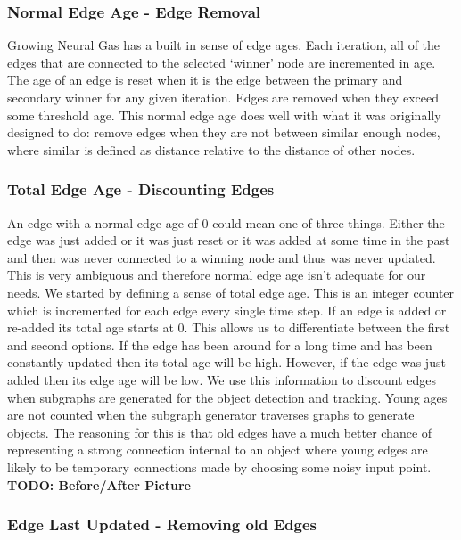 \documentclass{article}
\renewcommand{\|}{\origbar} %
\begin{document}
\subsubsection{Normal Edge Age - Edge Removal}

Growing Neural Gas has a built in sense of edge ages. Each iteration, all of the edges that are connected to the selected `winner' node are incremented in age. The age of an edge is reset when it is the edge between the primary and secondary winner for any given iteration. Edges are removed when they exceed some threshold age. This normal edge age does well with what it was originally designed to do: remove edges when they are not between similar enough nodes, where similar is defined as distance relative to the distance of other nodes.

\subsubsection{Total Edge Age - Discounting Edges}

An edge with a normal edge age of 0 could mean one of three things. Either the edge was just added or it was just reset or it was added at some time in the past and then was never connected to a winning node and thus was never updated. This is very ambiguous and therefore normal edge age isn't adequate for our needs. We started by defining a sense of total edge age. This is an integer counter which is incremented for each edge every single time step. If an edge is added or re-added its total age starts at 0. This allows us to differentiate between the first and second options. If the edge has been around for a long time and has been constantly updated then its total age will be high. However, if the edge was just added then its edge age will be low. We use this information to discount edges when subgraphs are generated for the object detection and tracking. Young ages are not counted when the subgraph generator traverses graphs to generate objects. The reasoning for this is that old edges have a much better chance of representing a strong connection internal to an object where young edges are likely to be temporary connections made by choosing some noisy input point. {\bf TODO: Before/After Picture}

\subsubsection{Edge Last Updated - Removing old Edges}
\end{document}
